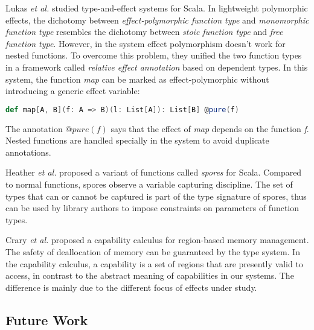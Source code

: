 Lukas \emph{et al.}  studied type-and-effect systems for
Scala\cite{rytz2012lightweight, rytz2013flow, lukas2014effect}.  In
lightweight polymorphic effects\cite{rytz2012lightweight}, the
dichotomy between \emph{effect-polymorphic function type} and
\emph{monomorphic function type} resembles the dichotomy between
\emph{stoic function type} and \emph{free function type}. However, in
the system effect polymorphism doesn't work for nested functions. To
overcome this problem, they unified the two function types in a
framework called \emph{relative effect annotation} based on dependent
types. In this system, the function \emph{map} can be marked as
effect-polymorphic without introducing a generic effect variable:

\begin{lstlisting}[language=Scala]
def map[A, B](f: A => B)(l: List[A]): List[B] @pure(f)
\end{lstlisting}

The annotation $@pure(f)$ says that the effect of \emph{map} depends
on the function \emph{f}. Nested functions are handled specially in
the system to avoid duplicate annotations.


Heather \emph{et al.} proposed a variant of functions called
\emph{spores} for Scala\cite{miller2014spores}. Compared to normal
functions, spores observe a variable capturing discipline. The set of
types that can or cannot be captured is part of the type signature of
spores, thus can be used by library authors to impose constraints on
parameters of function types.


Crary \emph{et al.} proposed a capability calculus for region-based
memory management\cite{crary1999typed}. The safety of deallocation of
memory can be guaranteed by the type system. In the capability
calculus, a capability is a set of regions that are presently valid to
access, in contrast to the abstract meaning of capabilities in our
systems. The difference is mainly due to the different focus of
effects under study.

\subsection{Future Work}

